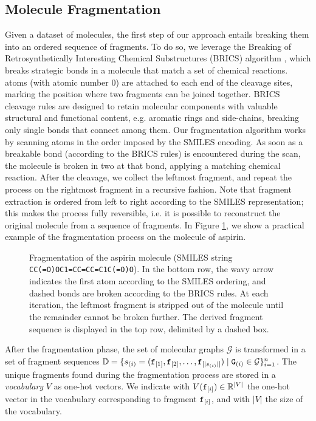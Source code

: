\subsection{Molecule Fragmentation}
Given a dataset of molecules, the first step of our approach entails breaking them into an ordered sequence of fragments. To do so, we leverage the Breaking of Retrosynthetically Interesting Chemical Substructures (BRICS) algorithm \citep{degen2008brics}, which breaks strategic bonds in a molecule that match a set of chemical reactions.  atoms (with atomic number 0) are attached to each end of the cleavage sites, marking the position where two fragments can be joined together. BRICS cleavage rules are designed to retain molecular components with valuable structural and functional content, e.g. aromatic rings and side-chains, breaking only single bonds that connect among them. Our fragmentation algorithm works by scanning atoms in the order imposed by the SMILES encoding. As soon as a breakable bond (according to the BRICS rules) is encountered during the scan, the molecule is broken in two at that bond, applying a matching chemical reaction. After the cleavage, we collect the leftmost fragment, and repeat the process on the rightmost fragment in a recursive fashion. Note that fragment extraction is ordered from left to right according to the SMILES representation; this makes the process fully reversible, i.e. it is possible to reconstruct the original molecule from a sequence of fragments. In Figure \ref{fig:fragmentation}, we show a practical example of the fragmentation process on the molecule of aspirin.
\begin{figure}[h!]
    \centering
    \resizebox{.98\textwidth}{!}{}
    \caption{Fragmentation of the aspirin molecule (SMILES string \texttt{CC(=O)OC1=CC=CC=C1C(=O)O}). In the bottom row, the wavy arrow indicates the first atom according to the SMILES ordering, and dashed bonds are broken according to the BRICS rules. At each iteration, the leftmost fragment is stripped out of the molecule until the remainder cannot be broken further. The derived fragment sequence is displayed in the top row, delimited by a dashed box.}
    \label{fig:fragmentation}
\end{figure}
After the fragmentation phase, the set of molecular graphs $\mathcal{G}$ is transformed in a set of fragment sequences $\Data = \{s_{(i)} = (\Graph{f}_{[1]}, \Graph{f}_{[2]}, \ldots, \Graph{f}_{[|s_{(i)}|]}) \mid \PatternGraph{G}{i} \in \mathcal{G}\}_{i=1}^n$. The unique fragments found during the fragmentation process are stored in a \emph{vocabulary} $V$ as one-hot vectors. We indicate with $V(\mathtt{f}_{[i]}) \in \mathbb{R}^{|V|}$ the one-hot vector in the vocabulary corresponding to fragment $\mathtt{f}_{[i]}$, and with $|V|$ the size of the vocabulary.

